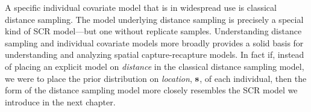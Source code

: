 A specific individual covariate model that is in widespread use is
classical distance sampling. The model underlying distance
sampling is precisely a special kind of SCR model---but one without
replicate samples. Understanding distance sampling and individual
covariate models more broadly provides a solid basis for understanding
and analyzing spatial capture-recapture models. In fact if, instead of
placing an explicit model on {\it distance} in the classical distance
sampling model, we were to place the prior distribution on {\it
  location}, ${\bf s}$, of each individual, then the form of the
distance sampling model more closely resembles the SCR model we
introduce in the next chapter.



